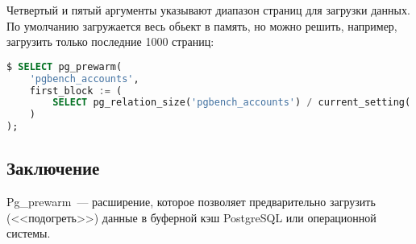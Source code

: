 Четвертый и пятый аргументы указывают диапазон страниц для загрузки данных. По умолчанию загружается весь обьект в память, но можно решить, например, загрузить только последние 1000 страниц:

\begin{lstlisting}[language=SQL,label=lst:pgprewarm3]
$ SELECT pg_prewarm(
    'pgbench_accounts',
    first_block := (
        SELECT pg_relation_size('pgbench_accounts') / current_setting('block_size')::int4 - 1000
    )
);
\end{lstlisting}


\subsection{Заключение}

Pg\_prewarm~--- расширение, которое позволяет предварительно загрузить (<<подогреть>>) данные в буферной кэш PostgreSQL или операционной системы.
